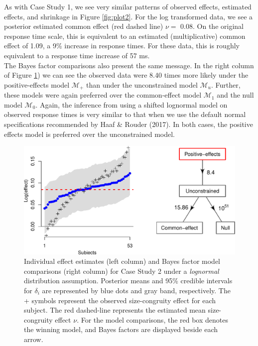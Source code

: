 \documentclass[12pt,twoside,a4paper]{article}
\begin{document}
As with Case Study 1, we see very similar patterns of observed effects, estimated effects, and shrinkage in Figure \ref{fig:plot2}. For the log transformed data, we see a posterior estimated common effect (red dashed line) \(\nu=\) 0.08. On the original response time scale, this is equivalent to an estimated (multiplicative) common effect of 1.09, a 9\% increase in response times. For these data, this is roughly equivalent to a response time increase of 57 ms.\\

The Bayes factor comparisons also present the same message. In the right column of Figure \ref{fig:plot2log}) we can see the observed data were 8.40 times more likely under the positive-effects model \(\mathcal{M}_+\) than under the unconstrained model \(\mathcal{M}_u\). Further, these models were again preferred over the common-effect model \(\mathcal{M}_1\) and the null model \(\mathcal{M}_0\). Again, the inference from using a shifted lognormal model on observed response times is very similar to that when we use the default normal specifications recommended by Haaf \& Rouder (2017). In both cases, the positive effects model is preferred over the unconstrained model.

\begin{figure}[htbp]
\centering
\includegraphics[width=\textwidth]{plot2log-1.pdf}
\caption{\label{fig:plot2log}Individual effect estimates (left column) and Bayes factor model comparisons (right column) for Case Study 2 under a \emph{lognormal} distribution assumption. Posterior means and 95\% credible intervals for \(\delta_i\) are represented by blue dots and gray band, respectively. The + symbols represent the observed size-congruity effect for each subject. The red dashed-line represents the estimated mean size-congruity effect \(\nu\). For the model comparisons, the red box denotes the winning model, and Bayes factors are displayed beside each arrow.}
\end{figure}
\end{document}
